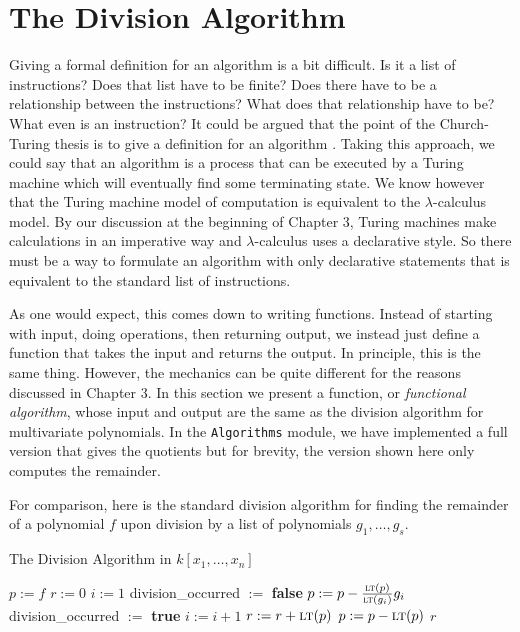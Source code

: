 \documentclass[MS, xcolor=dvipsnames]{wfuthesis}
\newcommand{\LT}{\ensuremath{\text{\sc lt}}}
\theoremstyle{definition}
\begin{document}
\section{The Division Algorithm}
Giving a formal definition for an algorithm is a bit difficult. Is it a list of instructions? Does that list have to be finite? Does there have to be a relationship between the instructions? What does that relationship have to be? What even is an instruction? It could be argued that the point of the Church-Turing thesis is to give a definition for an algorithm \cite{Kleene1952}. Taking this approach, we could say that an algorithm is a process that can be executed by a Turing machine which will eventually find some terminating state. We know however that the Turing machine model of computation is equivalent to the $\lambda$-calculus model. By our discussion at the beginning of Chapter 3, Turing machines make calculations in an imperative way and $\lambda$-calculus uses a declarative style. So there must be a way to formulate an algorithm with only declarative statements that is equivalent to the standard list of instructions. \par
As one would expect, this comes down to writing functions. Instead of starting with input, doing operations, then returning output, we instead just define a function that takes the input and returns the output. In principle, this is the same thing. However, the mechanics can be quite different for the reasons discussed in Chapter 3. In this section we present a function, or \emph{functional algorithm}, whose input and output are the same as the division algorithm for multivariate polynomials. In the \lstinline{Algorithms} module, we have implemented a full version that gives the quotients but for brevity, the version shown here only computes the remainder. \par
For comparison, here is the standard division algorithm for finding the remainder of a polynomial $f$ upon division by a list of polynomials $g_1,\dots,g_s$. \par
\begin{algorithm}
\caption{The Division Algorithm in $k[x_1,\dots,x_n]$}
\begin{algorithmic}
  \State $p:= f$
  \State $r:= 0$
    \State $i:= 1$
    \State division\_occurred $:=$ \textbf{false}
      \If{($\LT(g_i)$ divides $\LT(p)$)}
        \State $p := p - \frac{\LT(p)}{\LT(g_i)}g_i$
        \State division\_occurred $:=$ \textbf{true}
      \Else
        \State $i:= i+1$
      \EndIf
    \EndWhile
      \State $r := r + \LT(p)$
      \State $p := p - \LT(p)$
    \EndIf
  \EndWhile
  \State \Return $r$
\end{algorithmic}
\end{algorithm}
\end{document}
